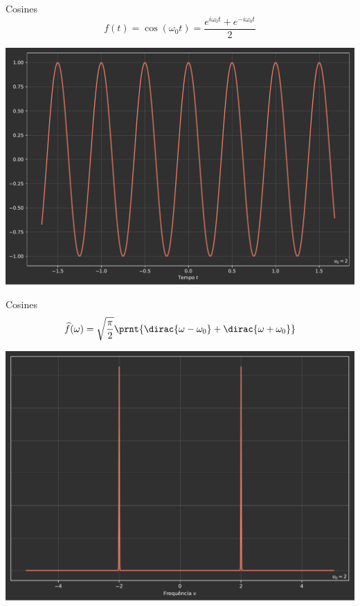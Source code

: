     \begin{frame}{Cosines}
        \begin{equation*}
            f(t) = \cos(\omega_0 t) = \frac{e^{i\omega_0t} + e^{-i\omega_0t}}{2}
        \end{equation*}
        
        \centering
        \includegraphics[height = 0.65 \textheight]{images/Pulse2.pdf}
    \end{frame}
    
    \begin{frame}{Cosines}
        \begin{equation*}
            \widehat{f}(\omega) = \sqrt{\frac{\pi}{2}}\prnt{\dirac{\omega-\omega_0} + \dirac{\omega+\omega_0}}    
        \end{equation*}
        
        \centering 
        \includegraphics[height = 0.65 \textheight]{images/Pulse2-Fourier.pdf}
    \end{frame}